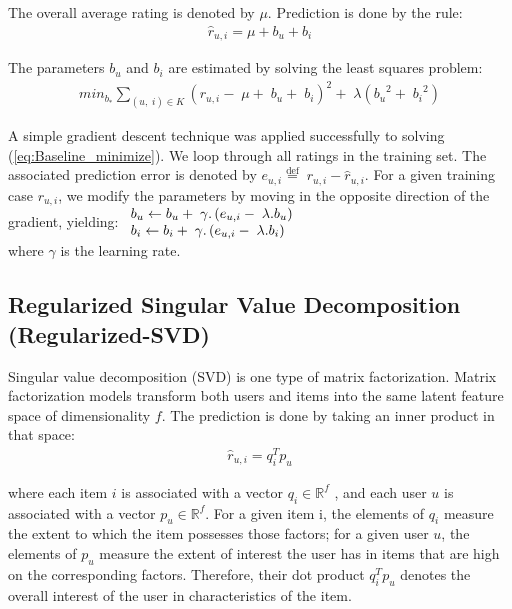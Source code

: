 \documentclass[oneside,13pt]{extreport}
\begin{document}
The overall average rating is denoted by $\mu$. Prediction is done by the rule:
\begin{eqnarray}
\label{eq:Baseline_predict}
{\hat r_{u,i}} = \mu + {b_u} + {b_i}
\end{eqnarray}

The parameters $b_u$ and $b_i$ are estimated by solving the least squares problem: 
\begin{eqnarray}
mi{n_{{b_*}}}\mathop \sum \limits_{\left( {u,\;i} \right) \in K} {\left( {{r_{u,i}} - \;\mu  + \;{b_u} + \;{b_i}} \right)^2} + \;\lambda \left( {{b_u}^2 + \;{b_i}^2} \right)
\label{eq:Baseline_minimize}
\end{eqnarray}

 A simple gradient descent technique was applied successfully to solving (\ref{eq:Baseline_minimize}).
We loop through all ratings in the training set. The associated prediction error is denoted by ${e_{u,i}} \stackrel{\text{def}}{=} \;{r_{u,i}} - \hat r_{u,i}$. For a given training case $r_{u,i}$, we modify the parameters by moving in the opposite direction of the gradient, yielding:
$
\begin{array}{l}{b_u} \leftarrow {b_u} + {\rm{\;}}\gamma .\left( {{e_{u,i}} - {\rm{\;}}\lambda .{b_u}} \right)\\{b_i} \leftarrow {b_i} + {\rm{\;}}\gamma .\left( {{e_{u,i}} - {\rm{\;}}\lambda .{b_i}} \right)\end{array}
$
\\where $\gamma$ is the learning rate.
\subsection{Regularized Singular Value Decomposition (Regularized-SVD)}
Singular value decomposition (SVD) is one type of matrix factorization. Matrix factorization models transform both users and items into the same latent feature space of dimensionality $f$. The prediction is done by taking an inner product in that space: 
\begin{eqnarray}
\label{eq:MF_predict}
{\hat r_{u,i}} = q_i^T{p_u} 
\end{eqnarray}

where each item $i$ is associated with a vector ${q_i} \in {\mathbb{R}^f}$ , and each user $u$ is associated with a vector ${p_u} \in {\mathbb{R}^f}$. For a given item i, the elements of $q_i$
measure the extent to which the item possesses those factors; for a given user $u$, the elements of $p_u$ measure the extent of interest the user has in items that are high on the corresponding factors. Therefore, their dot product $q_i^T{p_u}$ denotes the overall interest of the user in characteristics of the item.
\end{document}
